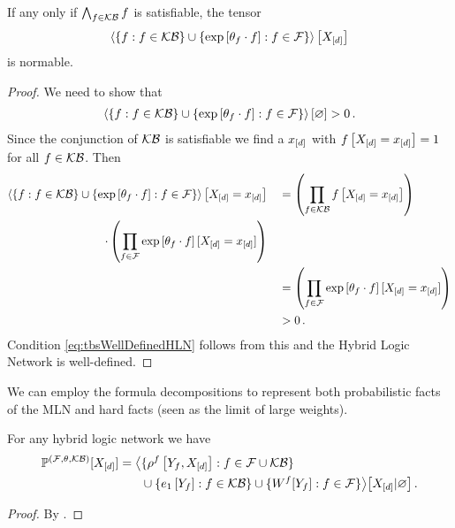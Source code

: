 \begin{theorem}
	If any only if $\bigwedge_{f\in\mathcal{KB}}f$ is satisfiable, the tensor 
		\[  \left\langle 
		\{f : f\in\mathcal{KB}\} \cup \{\mathrm{exp}\left[\theta_{f}\cdot f\right] : f\in\mathcal{F}\}
		\right\rangle \left[ X_{[d]} \right] \]
	is normable.
\end{theorem}
\begin{proof}
	We need to show that
	\begin{align}\label{eq:tbsWellDefinedHLN}
		\left\langle \{f : f\in\mathcal{KB}\} \cup \{\mathrm{exp}\left[\theta_{f}\cdot f\right] : f\in\mathcal{F}\}\right\rangle \left[ \varnothing \right] > 0 \, . 
	\end{align}
	Since the conjunction of $\mathcal{KB}$ is satisfiable we find a $x_{[d]}$ with $f\left[X_{[d]}=x_{[d]}\right]=1$ for all $f\in\mathcal{KB}$.
	Then 
	\begin{align*}
		\left\langle \{f : f\in\mathcal{KB}\} \cup \{\mathrm{exp}\left[\theta_{f}\cdot f\right] : f\in\mathcal{F}\}\right\rangle \left[ X_{[d]}=x_{[d]} \right]
		 & \quad = \left( \prod_{f\in\mathcal{KB}}f\left[X_{[d]}=x_{[d]}\right] \right) \\
		 \cdot \left( \prod_{f\in\mathcal{F}}\mathrm{exp}\left[\theta_{f}\cdot f\right][X_{[d]}=x_{[d]}] \right) \\
		 & \quad =  \left( \prod_{f\in\mathcal{F}}\mathrm{exp}\left[\theta_{f}\cdot f\right][X_{[d]}=x_{[d]}] \right) \\
		 & \quad > 0 \, .
	\end{align*}
	Condition \eqref{eq:tbsWellDefinedHLN} follows from this and the Hybrid Logic Network is well-defined.
\end{proof}



We can employ the formula decompositions to represent both probabilistic facts of the MLN and hard facts (seen as the limit of large weights).

\begin{theorem}\label{the:hybridNetworkRepresentation}
	For any hybrid logic network we have
	\begin{align*}
		\mathbb{P}^{(\mathcal{F},\theta,\mathcal{KB})}[X_{[d]}] 
		= \big\langle 
		&\{\rho^{f}\left[Y_{f},X_{[d]}\right] : f\in\mathcal{F}\cup\mathcal{KB} \} \\
		&\cup \{e_1\left[Y_{f}\right] : f\in\mathcal{KB} \}
		\cup \{W^{f}[Y_{f}] : f\in\mathcal{F} \}
		 \big\rangle \big[ X_{[d]} | \varnothing \big] \, .
	\end{align*}
\end{theorem}
\begin{proof}
	By .
\end{proof}

